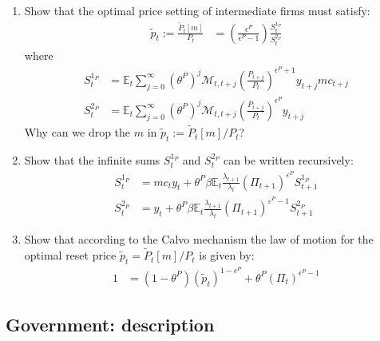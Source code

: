 \begin{enumerate}[resume]
\item
Show that the optimal price setting of intermediate firms must satisfy:
\begin{align}
\widetilde{p}_t := \frac{\widetilde{P}_{t}[m]}{P_{t}} &= \left(\frac{\epsilon^{P}}{\epsilon^{P}-1}\right) \frac{S^{1_{P}}_{t}}{S^{2_{P}}_{t}}
\label{eq:NewKeynesian.IntermediateFirms.PriceSetting}
\end{align}
where
\begin{align*}
S^{1_{P}}_{t} &= 
\mathbb{E}_{t} \sum_{j=0}^{\infty} {(\theta^{P})}^{j} \mathcal{M}_{t,t+j} {\left(\frac{P_{t+j}}{P_{t}}\right)}^{\epsilon^{P}+1} y_{t+j} {mc}_{t+j}
\\
S^{2_{P}}_{t} &= \mathbb{E}_{t} \sum_{j=0}^{\infty} {(\theta^{P})}^{j} \mathcal{M}_{t,t+j} {\left(\frac{P_{t+j}}{P_{t}}\right)}^{\epsilon^{P}} y_{t+j}
\end{align*}
Why can we drop the \(m\) in \(\widetilde{p}_{t}:=\widetilde{P}_{t}[m]/P_{t}\)?

\item
Show that the infinite sums \(S^{1_{P}}_{t}\) and \(S^{2_{P}}_{t}\) can be written recursively:
\begin{align}
S^{1_{P}}_{t} &= {mc}_{t} y_{t} + \theta^{P} \beta \mathbb{E}_{t} \frac{\lambda_{t+1}}{\lambda_{t}} {\left(\Pi_{t+1}\right)}^{\varepsilon^{P}} S^{1_{P}}_{t+1}  
\label{eq:NewKeynesian.IntermediateFirms.PriceSettingSum1}
\\
S^{2_{P}}_{t} &= y_{t} + \theta^{P} \beta \mathbb{E}_{t} \frac{\lambda_{t+1}}{\lambda_{t}} {\left(\Pi_{t+1}\right)}^{\varepsilon^{P}-1} S^{2_{P}}_{t+1}
\label{eq:NewKeynesian.IntermediateFirms.PriceSettingSum2}
\end{align}

\item
Show that according to the Calvo mechanism
  the law of motion for the optimal reset price
  \(\widetilde{p}_{t} = \widetilde{P}_{t}[m] / P_{t}\) is given by:
\begin{align}
1 &= \left(1-\theta^{P}\right) {(\widetilde{p}_{t})}^{1-\epsilon^{P}} + \theta^{P} {(\Pi_{t})}^{\epsilon^{P}-1}
\label{eq:NewKeynesian.ResetPriceLoM}
\end{align}

\end{enumerate}

\newpage

\subsection{Government: description}

